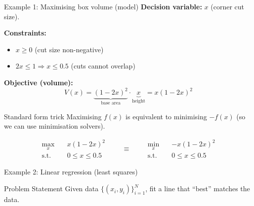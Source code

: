 \documentclass[aspectratio=169,10pt]{beamer}
\begin{document}
\begin{frame}{Example 1: Maximising box volume (model)}
\textbf{Decision variable:} $x$ (corner cut size).

\textbf{Constraints:}
\begin{itemize}
  \item $x\ge 0$ (cut size non-negative)
  \item $2x\le 1 \Rightarrow x\le 0.5$ (cuts cannot overlap)
\end{itemize}

\textbf{Objective (volume):}
\begin{equation*}
V(x)=\underbrace{(1-2x)^2}_{\text{base area}}\cdot \underbrace{x}_{\text{height}} = x(1-2x)^2
\end{equation*}

\begin{notebox}{Standard form trick}
Maximising $f(x)$ is equivalent to minimising $-f(x)$ (so we can use minimisation solvers).
\end{notebox}

\begin{equation*}
\begin{aligned}
\max_x\quad & x(1-2x)^2\\
\text{s.t.}\quad &0\le x\le 0.5
\end{aligned}
\qquad \equiv \qquad
\begin{aligned}
\min_x\quad & -x(1-2x)^2\\
\text{s.t.}\quad &0\le x\le 0.5
\end{aligned}
\end{equation*}
\end{frame}

\begin{frame}{Example 2: Linear regression (least squares)}
\begin{examplebox}{Problem Statement}
Given data $\{(x_i,y_i)\}_{i=1}^N$, fit a line that ``best'' matches the data.
\end{examplebox}

\begin{center}
\end{center}
\end{frame}
\end{document}
